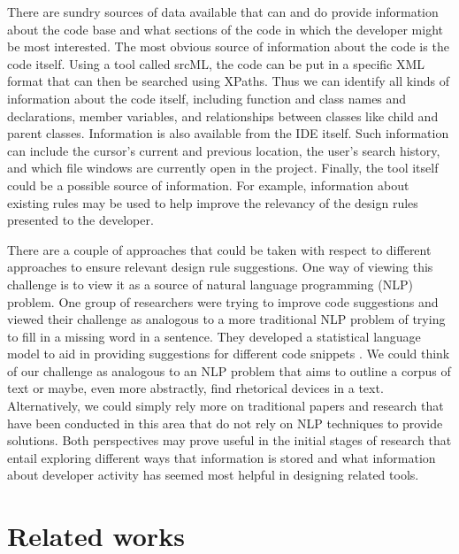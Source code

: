 \documentclass[12pt]{article}
\begin{document}
There are sundry sources of data available that can and do provide information about the code base and what sections of the code in which the developer might be most interested. The most obvious source of information about the code is the code itself. Using a tool called srcML, the code can be put in a specific XML format that can then be searched using XPaths. Thus we can identify all kinds of information about the code itself, including function and class names and declarations, member variables, and relationships between classes like child and parent classes. Information is also available from the IDE itself. Such information can include the cursor's current and previous location, the user's search history, and which file windows are currently open in the project. Finally, the tool itself could be a possible source of information. For example, information about existing rules may be used to help improve the relevancy of the design rules presented to the developer.

There are a couple of approaches that could be taken with respect to different approaches to ensure relevant design rule suggestions. One way of viewing this challenge is to view it as a source of natural language programming (NLP) problem. One group of researchers were trying to improve code suggestions and viewed their challenge as analogous to a more traditional NLP problem of trying to fill in a missing word in a sentence. They developed a statistical language model to aid in providing suggestions for different code snippets \cite{RaychevEtAl2014}. We could think of our challenge as analogous to an NLP problem that aims to outline a corpus of text or maybe, even more abstractly, find rhetorical devices in a text. Alternatively, we could simply rely more on traditional papers and research that have been conducted in this area that do not rely on NLP techniques to provide solutions. Both perspectives may prove useful in the initial stages of research that entail exploring different ways that information is stored and what information about developer activity has seemed most helpful in designing related tools. 





\clearpage


\section{Related works}\label{relatedWorks}
\end{document}
